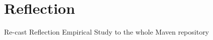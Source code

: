 
\chapter{Reflection} \label{cha:reflection}

Re-cast Reflection Empirical Study to the whole Maven repository
